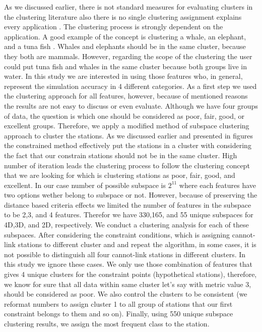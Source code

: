 As we discussed earlier, there is not standard measures for evaluating clusters in the clustering literature also there is no single clustering assignment explains every application \citep{Dy_2004_MLR,Jain_1988_Book,Hartigan_1985_JOC}. The clustering process is strongly dependent on the application. A good example of the concept is clustering a whale, an elephant, and a tuna fish \citep{Jain_1999,Watanabe_1985_Book}.  Whales and elephants should be in the same cluster, because they both are mammals. However, regarding the scope of the clustering the user could put tuna fish and whales in the same cluster because both groups live in water. In this study we are interested in using those features who, in general, represent the simulation accuracy in 4 different categories. As a first step we used the \kmeans{} clustering approach for all features, however, because of mentioned reasons the results are not easy to discuss or even evaluate. Although we have four groups of data, the question is which one should be considered as poor, fair, good, or excellent groups. Therefore, we apply a modified method of subspace clustering approach to cluster the stations. As we discussed earlier and presented in figures the constrained \kmeans{} method effectively put the stations in a cluster with considering the fact that our constrain stations should not be in the same cluster. High number of iteration leads the clustering process to follow the clustering concept that we are looking for which is clustering stations as poor, fair, good, and excellent. In our case number of possible subspace is $2^{11}$ where each features have two options wether belong to subspace or not. However, because of preserving the distance based criteria effects we limited the number of features in the subspace to be 2,3, and 4 features. Therefor we have 330,165, and 55 unique subspaces for 4D,3D, and 2D, respectively. We conduct a \kmeans{} clustering analysis for each of these subspaces. After considering the constraint conditions, which is assigning cannot-link stations to different cluster and and repeat the \kmeans{} algorithm, in some cases, it is not possible to distinguish all four cannot-link stations in different clusters. In this study we ignore these cases. We only use those combination of features that gives 4 unique clusters for the constraint points (hypothetical stations), therefore, we know for sure that all data within same cluster let's say with metric value 3, should be considered as poor. We also control the clusters to be consistent (we reformat numbers to assign cluster 1 to all group of stations that our first constraint belongs to them and so on). Finally, using 550 unique subspace clustering results, we assign the most frequent class to the station. 


